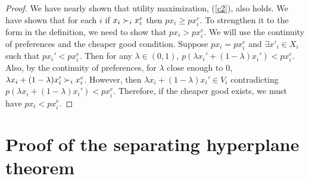 \begin{proof}
  We have nearly shown that utility maximization, (\ref{c2}), also
  holds. We have shown that for each $i$ if $x_i \succ_i x_i^e$ then
  $p x_i \geq p x_i^e$. To strengthen it to the form in the
  definition, we need to show that $px_i > p x_i^e$. We will use the
  continuity of preferences and the cheaper good condition. Suppose $p
  x_i = p x_i^e$ and $\exists x'_i \in X_i$ such that $p x_i' < p
  x_i^e$. Then for any $\lambda \in (0,1)$, $p(\lambda x_i'
  +(1-\lambda) x_i') < p x_i^e$. Also, by the continuity of
  preferences, for $\lambda$ close enough to $0$, $\lambda x_i +
  (1-\lambda)x_i' \succ_i x_i^e$. However, then $\lambda x_i +
  (1-\lambda) x_i' \in V_i$ contradicting $p(\lambda x_i
  +(1-\lambda) x_i') < p x_i^e$. Therefore, if the cheaper good
  exists, we must have $p x_i < p x_i^e$.   
\end{proof}

\clearpage
\appendix
\section{Proof of the separating hyperplane theorem \label{app:hyperplane}}

